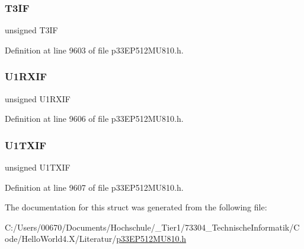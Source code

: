 \subsubsection{\texorpdfstring{T3\+IF}{T3IF}}
{\footnotesize\ttfamily unsigned T3\+IF}



Definition at line 9603 of file p33\+E\+P512\+M\+U810.\+h.

\mbox{\label{structtag_i_f_s0_b_i_t_s_aeba83f78089f87ddc134906d8ed45441}} 
\subsubsection{\texorpdfstring{U1\+R\+X\+IF}{U1RXIF}}
{\footnotesize\ttfamily unsigned U1\+R\+X\+IF}



Definition at line 9606 of file p33\+E\+P512\+M\+U810.\+h.

\mbox{\label{structtag_i_f_s0_b_i_t_s_ad749e93383582e0fbfc2e7121efba5f8}} 
\subsubsection{\texorpdfstring{U1\+T\+X\+IF}{U1TXIF}}
{\footnotesize\ttfamily unsigned U1\+T\+X\+IF}



Definition at line 9607 of file p33\+E\+P512\+M\+U810.\+h.



The documentation for this struct was generated from the following file\+:\begin{DoxyCompactItemize}
\item 
C\+:/\+Users/00670/\+Documents/\+Hochschule/\+\_\+\+Tier1/73304\+\_\+\+Technische\+Informatik/\+Code/\+Hello\+World4.\+X/\+Literatur/\hyperlink{p33_e_p512_m_u810_8h}{p33\+E\+P512\+M\+U810.\+h}\end{DoxyCompactItemize}

